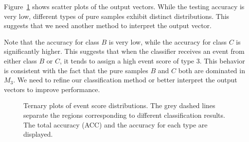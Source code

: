 \documentclass[12pt]{article}
\begin{document}
        Figure~\ref{fig:event_score_distribution_ambiguous} shows scatter plots of the output vectors. While the testing accuracy is very low, different types of pure samples exhibit distinct distributions. This suggests that we need another method to interpret the output vector. 

        Note that the accuracy for class $B$ is very low, while the accuracy for class $C$ is significantly higher. This suggests that when the classifier receives an event from either class $B$ or $C$, it tends to assign a high event score of type 3. This behavior is consistent with the fact that the pure samples $B$ and $C$ both are dominated in $M_3$. We need to refine our classification method or better interpret the output vectors to improve performance.
        \begin{figure}[htpb]
            \centering
            \caption{Ternary plots of event score distributions. The grey dashed lines separate the regions corresponding to different classification results. The total accuracy (ACC) and the accuracy for each type are displayed.}
            \label{fig:event_score_distribution_ambiguous}
        \end{figure} 
\end{document}
